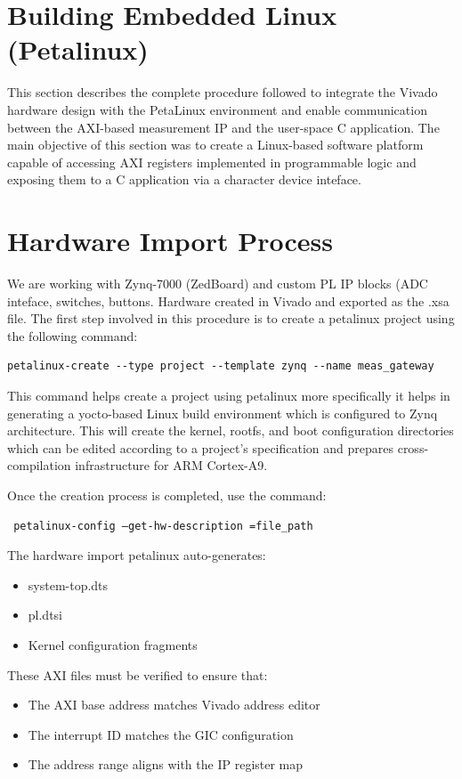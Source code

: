 \section{Building Embedded Linux (Petalinux)}

This section describes the complete procedure followed to integrate the Vivado hardware design with the PetaLinux environment and enable communication between the AXI-based measurement IP and the user-space C application. The main objective of this section was to create a Linux-based software platform capable of accessing AXI registers implemented in programmable logic and exposing them to a C application via a character device inteface.

\section{Hardware Import Process}
We are working with Zynq-7000 (ZedBoard) and custom PL IP blocks (ADC inteface, switches, buttons. Hardware created in Vivado and exported as the .xsa file. The first step involved in this procedure is to create a petalinux project using the following command:
\begin{verbatim}
petalinux-create --type project --template zynq --name meas_gateway
\end{verbatim}

This command helps create a project using petalinux more specifically it helps in generating a yocto-based Linux build environment which is configured to Zynq architecture. This will create the kernel, rootfs, and boot configuration directories which can be edited according to a project’s specification and prepares cross-compilation infrastructure for ARM Cortex-A9.

Once the creation process is completed, use the command:
\begin{verbatim}
 petalinux-config –get-hw-description =file_path 
\end{verbatim}

The hardware import petalinux auto-generates: 
\begin{itemize}
\item system-top.dts
\item pl.dtsi
\item Kernel configuration fragments
\end{itemize}
These AXI files must be verified to ensure that:
\begin{itemize}
    \item The AXI base address matches Vivado address editor
    \item The interrupt ID matches the GIC configuration
    \item The address range aligns with the IP register map
\end{itemize}

